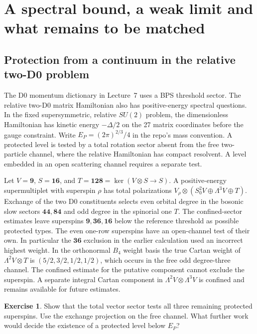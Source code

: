 \documentclass[10pt]{article}
\theoremstyle{definition}
\newtheorem{exercise}{Exercise}
\begin{document}
\section{A spectral bound, a weak limit and what remains to be matched}

\subsection{Protection from a continuum in the relative two-D0 problem}

The D0 momentum dictionary in Lecture~7 uses a BPS threshold sector. The relative two-D0 matrix Hamiltonian also has positive-energy spectral questions. In the fixed supersymmetric, relative \(SU(2)\) problem, the dimensionless Hamiltonian has kinetic energy \(-\Delta/2\) on the 27 matrix coordinates before the gauge constraint. Write \(E_P=(2\pi)^{2/3}/4\) in the repo's mass convention. A protected level is tested by a total rotation sector absent from the free two-particle channel, where the relative Hamiltonian has compact resolvent. A level embedded in an open scattering channel requires a separate test.

Let \(V=\mathbf9\), \(S=\mathbf{16}\), and \(T=\mathbf{128}=\ker(V\otimes S\to S)\). A positive-energy supermultiplet with superspin \(\rho\) has total polarizations \(V_\rho\otimes(S_0^2 V\oplus\Lambda^3 V\oplus T)\). Exchange of the two D0 constituents selects even orbital degree in the bosonic slow sectors \(\mathbf{44},\mathbf{84}\) and odd degree in the spinorial one \(T\). The confined-sector estimates leave superspins \(\mathbf9,\mathbf{36},\mathbf{16}\) below the reference threshold as possible protected types. The even one-row superspins have an open-channel test of their own. In particular the \(\mathbf{36}\) exclusion in the earlier calculation used an incorrect highest weight. In the orthonormal \(B_4\) weight basis the true Cartan weight of \(\Lambda^2 V\otimes T\) is \((5/2,3/2,1/2,1/2)\), which occurs in the free odd degree-three channel. The confined estimate for the putative component cannot exclude the superspin. A separate integral Cartan component in \(\Lambda^2 V\otimes\Lambda^3 V\) is confined and remains available for future estimates.

\begin{exercise}
Show that the total vector sector tests all three remaining protected superspins. Use the exchange projection on the free channel. What further work would decide the existence of a protected level below \(E_P\)?
\end{exercise}
\end{document}
